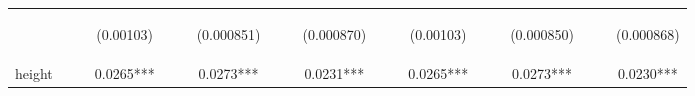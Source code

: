 \documentclass[]{article}
\begin{document}
\begin{center}
\begin{tabular}{lcccccccccccccccccc}
\vspace{4pt} & \begin{footnotesize}\end{footnotesize} & \begin{footnotesize}\end{footnotesize} & \begin{footnotesize}(0.00103)\end{footnotesize} & \begin{footnotesize}\end{footnotesize} & \begin{footnotesize}\end{footnotesize} & \begin{footnotesize}(0.000851)\end{footnotesize} & \begin{footnotesize}\end{footnotesize} & \begin{footnotesize}\end{footnotesize} & \begin{footnotesize}(0.000870)\end{footnotesize} & \begin{footnotesize}\end{footnotesize} & \begin{footnotesize}\end{footnotesize} & \begin{footnotesize}(0.00103)\end{footnotesize} & \begin{footnotesize}\end{footnotesize} & \begin{footnotesize}\end{footnotesize} & \begin{footnotesize}(0.000850)\end{footnotesize} & \begin{footnotesize}\end{footnotesize} & \begin{footnotesize}\end{footnotesize} & \begin{footnotesize}(0.000868)\end{footnotesize} \\
height &  &  & 0.0265*** &  &  & 0.0273*** &  &  & 0.0231*** &  &  & 0.0265*** &  &  & 0.0273*** &  &  & 0.0230*** \\

\end{tabular}
\end{center}
\end{document}
